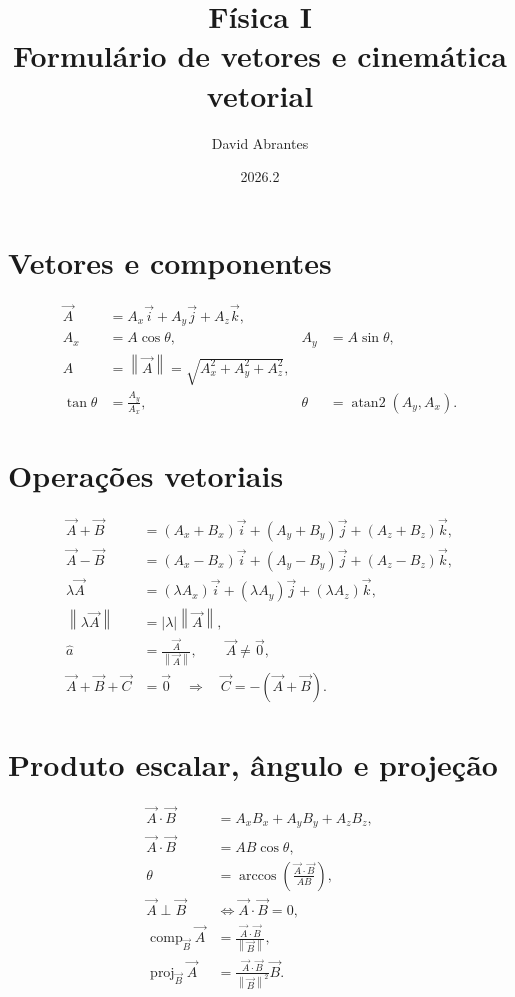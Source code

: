 \documentclass[12pt,a4paper]{article}
\title{\textcolor{azul}{\textbf{Física I}}\\Formulário de vetores e cinemática vetorial}
\author{David Abrantes}
\date{2026.2}
\newcommand{\vi}{\vec{i}}
\newcommand{\vj}{\vec{j}}
\newcommand{\vk}{\vec{k}}
\newcommand{\norm}[1]{\left\lVert #1\right\rVert}
\begin{document}
\maketitle

\section*{Vetores e componentes}
\begin{align*}
\vec A &= A_x\vi+A_y\vj+A_z\vk,\\
A_x &= A\cos\theta, & A_y &= A\sin\theta,\\
A &= \norm{\vec A}=\sqrt{A_x^2+A_y^2+A_z^2},\\
\tan\theta &= \frac{A_y}{A_x}, &
\theta &= \operatorname{atan2}(A_y,A_x).
\end{align*}

\section*{Operações vetoriais}
\begin{align*}
\vec A+\vec B
&=(A_x+B_x)\vi+(A_y+B_y)\vj+(A_z+B_z)\vk,\\
\vec A-\vec B
&=(A_x-B_x)\vi+(A_y-B_y)\vj+(A_z-B_z)\vk,\\
\lambda\vec A
&=(\lambda A_x)\vi+(\lambda A_y)\vj+(\lambda A_z)\vk,\\
\norm{\lambda\vec A}&=|\lambda|\norm{\vec A},\\
\hat a&=\frac{\vec A}{\norm{\vec A}},\qquad \vec A\ne\vec0,\\
\vec A+\vec B+\vec C&=\vec0
\quad\Longrightarrow\quad \vec C=-(\vec A+\vec B).
\end{align*}

\section*{Produto escalar, ângulo e projeção}
\begin{align*}
\vec A\cdot\vec B
&=A_xB_x+A_yB_y+A_zB_z,\\
\vec A\cdot\vec B&=AB\cos\theta,\\
\theta&=\arccos\left(\frac{\vec A\cdot\vec B}{AB}\right),\\
\vec A\perp\vec B&\Longleftrightarrow \vec A\cdot\vec B=0,\\
\operatorname{comp}_{\vec B}\vec A
&=\frac{\vec A\cdot\vec B}{\norm{\vec B}},\\
\operatorname{proj}_{\vec B}\vec A
&=\frac{\vec A\cdot\vec B}{\norm{\vec B}^{2}}\vec B.
\end{align*}
\end{document}
